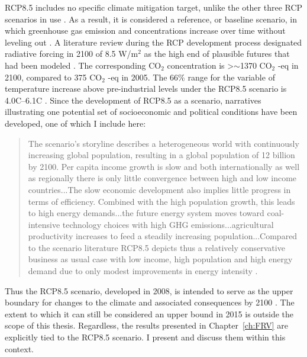 RCP8.5 includes no specific climate mitigation target, unlike the other three RCP scenarios in use \citep{Riahi2011}. As a result, it is considered a reference, or baseline scenario, in which greenhouse gas emission and concentrations increase over time without leveling out \citep{Riahi2011}. A literature review during the RCP development process designated radiative forcing in 2100 of 8.5 W/m$^2$ as the high end of plausible futures that had been modeled \citep{VanVuuren2011}. The corresponding $\text{CO}_2$ concentration is \textgreater $\sim$1370 $\text{CO}_2$ -eq in 2100, compared to 375 $\text{CO}_2$ -eq in 2005. The 66\% range for the variable of temperature increase above pre-industrial levels under the RCP8.5 scenario is 4.0\textdegree C--6.1\textdegree C \citep{Rogelj2012}. Since the development of RCP8.5 as a scenario, narratives illustrating one potential set of socioeconomic and political conditions have been developed, one of which I include here:
%
\begin{quote} 
The scenario’s storyline describes a heterogeneous world with continuously increasing global population, resulting in a global population of 12 billion by 2100. Per capita income growth is slow and both internationally as well as regionally there is only little convergence between high and low income countries...The slow economic development also implies little progress in terms of efficiency. Combined with the high population growth, this leads to high energy demands...the future energy system moves toward coal-intensive technology choices with high GHG emissions...agricultural productivity increases to feed a steadily increasing population...Compared to the scenario literature RCP8.5 depicts thus a relatively conservative business as usual case with low income, high population and high energy demand due to only modest improvements in energy intensity \citep{Riahi2011}.
\end{quote}
%
Thus the RCP8.5 scenario, developed in 2008, is intended to serve as the upper boundary for changes to the climate and associated consequences by 2100 \citep{Moss2008}. The extent to which it can still be considered an upper bound in 2015 is outside the scope of this thesis. Regardless, the results presented in Chapter~\ref{ch:FRV} are explicitly tied to the RCP8.5 scenario. I present and discuss them within this context.


